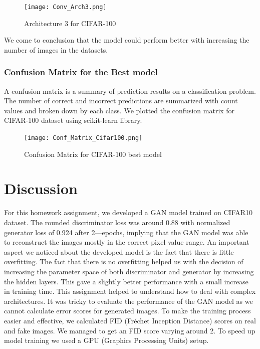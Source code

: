 \documentclass{article}
\begin{document}
\begin{figure}[H]
    \centering
    \texttt{[image: Conv\_Arch3.png]}
    \caption{Architecture 3 for CIFAR-100}
    \label{fig:Arch3_CNN}
\end{figure}

 We come to conclusion that the model could perform better with increasing the number of images in the datasets.

\subsubsection{Confusion Matrix for the Best model}
A confusion matrix is a summary of prediction results on a classification problem. The number of correct and incorrect predictions are summarized with count values and broken down by each class. We plotted the confusion matrix for CIFAR-100 dataset using scikit-learn library.

\begin{figure}[H]
    \centering
    \texttt{[image: Conf\_Matrix\_Cifar100.png]}
    \caption{Confusion Matrix for CIFAR-100 best model}
    \label{fig:Conf_matrix_Cifar100}
\end{figure}
\fi

\section{Discussion}
For this homework assignment, we developed a GAN model trained on CIFAR10 dataset. The rounded discriminator loss was around 0.88 with normalized generator loss of 0.924 after 2—epochs, implying that the GAN model was able to reconstruct the images mostly in the correct pixel value range. An important aspect we noticed about the developed model is the fact that there is little overfitting. The fact that there is no overfitting helped us with the decision of increasing the parameter space of both discriminator and generator by increasing the hidden layers. This gave a slightly better performance with a small increase in training time. This assignment helped to understand how to deal with complex architectures. It was tricky to evaluate the performance of the GAN model as we cannot calculate error scores for generated images. To make the training process easier and effective, we calculated FID (Fréchet Inception Distance) scores on real and fake images. We managed to get an FID score varying around 2. To speed up model training we used a GPU (Graphics Processing Units) setup. 
\end{document}
